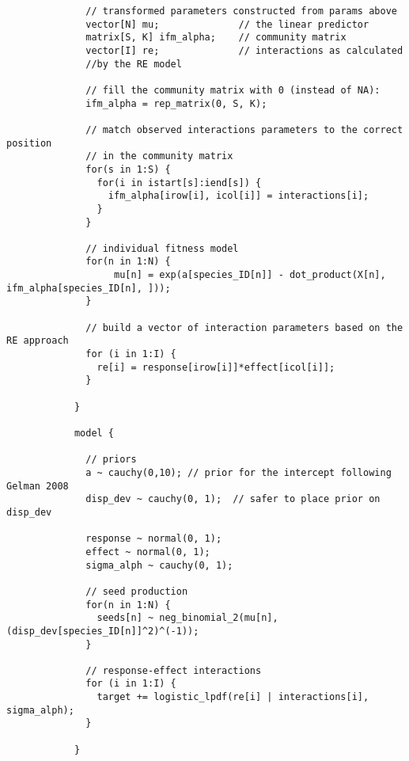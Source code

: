 \documentclass[a4,12pt]{article}
\begin{document}
\begin{lstlisting}
              // transformed parameters constructed from params above
              vector[N] mu;              // the linear predictor
              matrix[S, K] ifm_alpha;    // community matrix 
              vector[I] re;              // interactions as calculated 
              //by the RE model
              
              // fill the community matrix with 0 (instead of NA):
              ifm_alpha = rep_matrix(0, S, K);   
              
              // match observed interactions parameters to the correct position 
              // in the community matrix
              for(s in 1:S) {
                for(i in istart[s]:iend[s]) {
                  ifm_alpha[irow[i], icol[i]] = interactions[i];
                }
              }
              
              // individual fitness model 
              for(n in 1:N) {
                   mu[n] = exp(a[species_ID[n]] - dot_product(X[n], ifm_alpha[species_ID[n], ]));  
              }
              
              // build a vector of interaction parameters based on the RE approach
              for (i in 1:I) {
                re[i] = response[irow[i]]*effect[icol[i]];
              }
              
            } 

            model {

              // priors
              a ~ cauchy(0,10); // prior for the intercept following Gelman 2008
              disp_dev ~ cauchy(0, 1);  // safer to place prior on disp_dev
              
              response ~ normal(0, 1);   
              effect ~ normal(0, 1);
              sigma_alph ~ cauchy(0, 1);

              // seed production 
              for(n in 1:N) {
                seeds[n] ~ neg_binomial_2(mu[n], (disp_dev[species_ID[n]]^2)^(-1));
              }

              // response-effect interactions
              for (i in 1:I) {
                target += logistic_lpdf(re[i] | interactions[i], sigma_alph);
              }
              
            } 



        \end{lstlisting}
\end{document}
